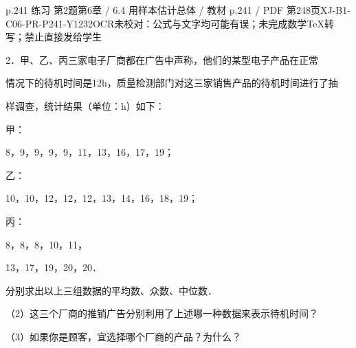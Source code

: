 \begin{bankitem}{p.241 练习 第2题}{第6章 / 6.4 用样本估计总体 / 教材 p.241 / PDF 第248页}{XJ-B1-C06-PR-P241-Y1232}{OCR未校对：公式与文字均可能有误；未完成数学TeX转写；禁止直接发给学生}
\begin{ocrdraft}
\par
2．甲、乙、丙三家电子厂商都在广告中声称，他们的某型电子产品在正常
\par
情况下的待机时间是12h，质量检测部门对这三家销售产品的待机时间进行了抽
\par
样调查，统计结果（单位：h）如下：
\par
甲：
\par
8，9，9，9，9，11，13，16，17，19；
\par
乙：
\par
10，10，12，12，12，13，14，16，18，19；
\par
丙：
\par
8，8，8，10，11，
\par
13，17，19，20，20．
\par
分别求出以上三组数据的平均数、众数、中位数．
\par
（2）这三个厂商的推销广告分别利用了上述哪一种数据来表示待机时间？
\par
（3）如果你是顾客，宜选择哪个厂商的产品？为什么？
\end{ocrdraft}
\end{bankitem}
